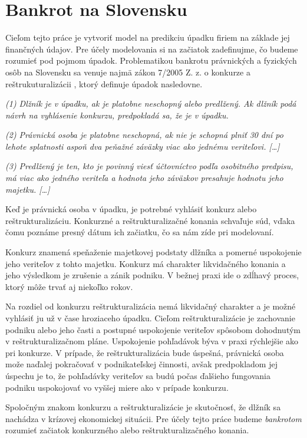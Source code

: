 \section{Bankrot na Slovensku}
\label{bankruptcy}

Cieľom tejto práce je vytvoriť model na predikciu úpadku firiem na základe jej finančných údajov.
Pre účely modelovania si na začiatok zadefinujme, čo budeme rozumieť pod pojmom úpadok.
Problematikou bankrotu právnických a fyzických osôb na Slovensku sa venuje najmä zákon 7/2005 Z. z. o konkurze a reštrukuturalizácii \cite{zbierkazakonov},
ktorý definuje úpadok nasledovne.

\bigskip
\textit{(1)
Dlžník je v úpadku, ak je platobne neschopný alebo predlžený. Ak dlžník podá návrh na vyhlásenie konkurzu, predpokladá sa, že je v úpadku.}

\textit{(2)
Právnická osoba je platobne neschopná, ak nie je schopná plniť 30 dní po lehote splatnosti aspoň dva peňažné záväzky viac ako jednému veriteľovi. […]}

\textit{(3)
Predlžený je ten, kto je povinný viesť účtovníctvo podľa osobitného predpisu, má viac ako jedného veriteľa a hodnota jeho záväzkov presahuje hodnotu jeho majetku. […]}
\bigskip

Keď je právnická osoba v úpadku, je potrebné vyhlásiť konkurz alebo reštrukturalizáciu.
Konkurzné a reštrukturalizačné konania schvaľuje súd, vďaka čomu poznáme presný dátum ich začiatku, čo sa nám zíde pri modelovaní.

Konkurz znamená speňaženie majetkovej podstaty dlžníka a pomerné uspokojenie jeho veriteľov z tohto majetku.
Konkurz má charakter likvidačného konania a jeho výsledkom je zrušenie a zánik podniku.
V bežnej praxi ide o zdĺhavý proces, ktorý môže trvať aj niekoľko rokov.

Na rozdiel od konkurzu reštrukturalizácia nemá likvidačný charakter a je možné vyhlásiť ju už v čase hroziaceho úpadku.
Cieľom reštrukturalizácie je zachovanie podniku alebo jeho časti a postupné uspokojenie veriteľov spôsobom dohodnutým v reštrukturalizačnom pláne.
Uspokojenie pohľadávok býva v praxi rýchlejšie ako pri konkurze.
V prípade, že reštrukturalizácia bude úspešná, právnická osoba može naďalej pokračovať v podnikateľskej činnosti,
avšak predpokladom jej úspechu je to, že pohľadávky veriteľov sa budú počas ďalšieho fungovania podniku uspokojovať vo vyššej miere ako v prípade konkurzu.

Spoločným znakom konkurzu a reštrukturalizácie je skutočnosť, že dlžník sa nachádza v krízovej ekonomickej situácii.
Pre účely tejto práce budeme \emph{bankrotom} rozumieť začiatok konkurzného alebo reštrukturalizačného konania.

